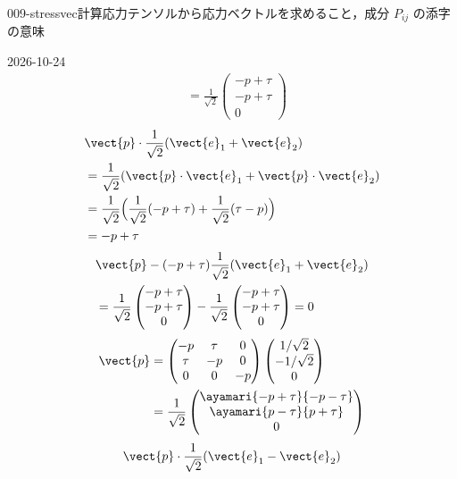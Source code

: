 \documentclass[uplatex,dvipdfmx,a4paper,11pt]{jsarticle}
\begin{document}
\begin{mondai}{009-stressvec}{計算}{応力テンソルから応力ベクトルを求めること，成分 $P_{ij}$ の添字の意味}
\begin{kotaeutsushi}{2026-10-24}
\begin{align*}
&=\frac{1}{\sqrt{2}}\begin{pmatrix}-p+\tau\\-p+\tau\\0\end{pmatrix}
\end{align*}
\begin{align*}
&\vect{p}\cdot\frac{1}{\sqrt{2}}(\vect{e}_{1}+\vect{e}_{2})\\
&=\frac{1}{\sqrt{2}}(\vect{p}\cdot\vect{e}_{1}+\vect{p}\cdot\vect{e}_{2})\\
&=\frac{1}{\sqrt{2}}\Bigl(\frac{1}{\sqrt{2}}(-p+\tau)+\frac{1}{\sqrt{2}}(\tau-p)\Bigr)\\
&=-p+\tau
\end{align*}
\begin{align*}
&\vect{p}-(-p+\tau)\frac{1}{\sqrt{2}}(\vect{e}_{1}+\vect{e}_{2})\\
&=\frac{1}{\sqrt{2}}\begin{pmatrix}-p+\tau\\-p+\tau\\0\end{pmatrix}-\frac{1}{\sqrt{2}}\begin{pmatrix}-p+\tau\\-p+\tau\\0\end{pmatrix}=0
\end{align*}
\begin{align*}
\vect{p}&=\begin{pmatrix}-p&\tau&0\\\tau&-p&0\\0&0&-p\end{pmatrix}\begin{pmatrix}1/\sqrt{2}\\-1/\sqrt{2}\\0\end{pmatrix}\\
&=\frac{1}{\sqrt{2}}\begin{pmatrix}\ayamari{-p+\tau}{-p-\tau}\\\ayamari{p-\tau}{p+\tau}\\0\end{pmatrix}
\end{align*}
\begin{align*}
&\vect{p}\cdot\frac{1}{\sqrt{2}}(\vect{e}_{1}-\vect{e}_{2})\\

\end{align*}
\end{kotaeutsushi}
\end{mondai}
\end{document}
